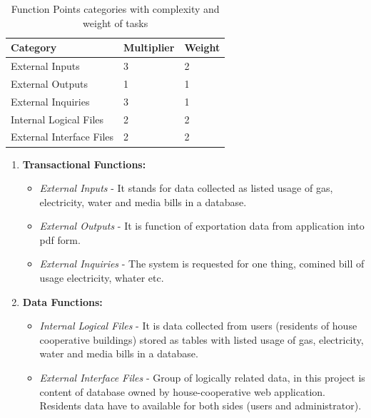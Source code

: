 \documentclass[a4paper,11pt,onecolumn,oneside]{book}
\begin{document}
\begin{table}[H]
	\centering
\begin{tabular}{|l|l|l|}
\hline
\rowcolor{pink!80!}\textbf{Category}& \textbf{Multiplier} & \textbf{Weight} \\ \hline
External Inputs          & 3          & 2      \\ \hline
External Outputs         & 1          & 1      \\ \hline
External Inquiries       & 3          & 1      \\ \hline
Internal Logical Files   & 2          & 2      \\ \hline
External Interface Files & 2          & 2      \\ \hline
\end{tabular}
\caption{Function Points categories with complexity and weight of tasks}
 \label{tab:func_pts_cat}
\end{table}

  \begin{enumerate}

 \item\textbf{Transactional Functions:}
   \begin{itemize} 
  \item \textit{External Inputs} - It stands for data collected as listed usage of gas, electricity, water and media bills in a database.
  \item \textit{External Outputs} - It is function of exportation data from application into pdf form.
  \item \textit{External Inquiries} - The system is requested for one thing, comined bill of usage electricity, whater etc.
  \end{itemize}
  
\item\textbf{Data Functions:}
  \begin{itemize}
  \item \textit{Internal Logical Files} - It is data collected from users (residents of house cooperative buildings) stored as tables with listed usage of gas, electricity, water and media bills in a database.
  \item \textit{External Interface Files} - Group of logically related data, in this project is content of database owned by house-cooperative web application. Residents data have to available for both sides (users and administrator).
  \end{itemize}  
 
  \end{enumerate}
\end{document}
